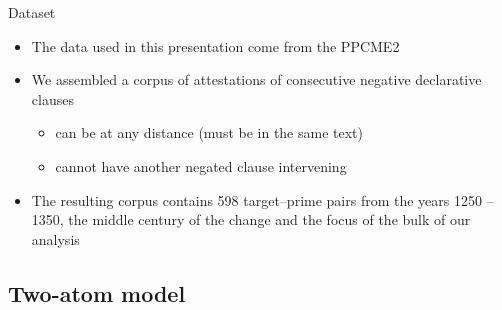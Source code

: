 \documentclass{digs-slides}
\begin{document}
\begin{frame}{Dataset}
    \begin{itemize}
      \item The data used in this presentation come from the
        PPCME2 \parencite{Kroch2001}
      \item We assembled a corpus of attestations of consecutive
        negative declarative clauses
        \begin{itemize}
          \item can be at any distance (must be in the same text)
          \item cannot have another negated clause intervening
        \end{itemize}
      \item The resulting corpus contains 598 target–prime pairs from
        the years 1250 – 1350, the middle century of the change and the
        focus of the bulk of our analysis
    \end{itemize}
\end{frame}



\subsection{Two-atom model}
\end{document}
